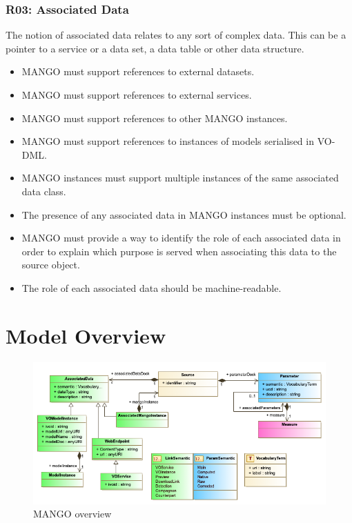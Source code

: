 \documentclass[11pt,a4paper]{ivoa}
\begin{document}
\begin{itemize}
\subsubsection{R03: Associated Data}
The notion of associated data relates to any sort of complex data. This can be a pointer to a service or a data set, a data table or  other data structure.
\begin{itemize}
    \item MANGO must support references to external datasets.
    \item MANGO must support references to external services.
    \item MANGO must support references to other MANGO instances.
    \item MANGO  must support references to instances of models serialised in VO-DML.
    \item MANGO instances must support multiple instances of the same associated data class.
    \item The presence of any associated data in MANGO instances must be optional.
    \item MANGO must provide a way to identify the role of each associated data in order to explain which purpose is served when associating this data to the source object.
    \item The role of each associated data should be machine-readable.
 \end{itemize}

\section{Model Overview}

\begin{figure}
\includegraphics[width=1.0\textwidth]{../model/mangoOverview.png}
\caption{MANGO overview}
\label{fig:overview}
\end{figure}



\end{itemize}
\end{document}
